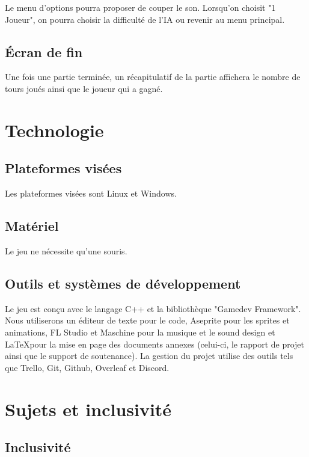 \documentclass[a4paper]{scrreprt}
\begin{document}
Le menu d'options pourra proposer de couper le son.
Lorsqu'on choisit "1 Joueur", on pourra choisir la difficulté de l'IA ou revenir au menu principal.

\section{\'Ecran de fin}

Une fois une partie terminée, un récapitulatif de la partie affichera le nombre de tours joués ainsi que le joueur qui a gagné.



\chapter{Technologie}


\section{Plateformes visées}
Les plateformes visées sont Linux et Windows.

\section{Matériel}

Le jeu ne nécessite qu'une souris.

\section{Outils et systèmes de développement}
Le jeu est conçu avec le langage C++ et la bibliothèque "Gamedev Framework". 
Nous utiliserons un éditeur de texte pour le code, Aseprite pour les sprites et animations, FL Studio et Maschine pour la musique et le sound design et \LaTeX pour la mise en page des documents annexes (celui-ci, le rapport de projet ainsi que le support de soutenance).
La gestion du projet utilise des outils tels que Trello, Git, Github, Overleaf et Discord.



\chapter{Sujets et inclusivité}

\section{Inclusivité}
\end{document}

